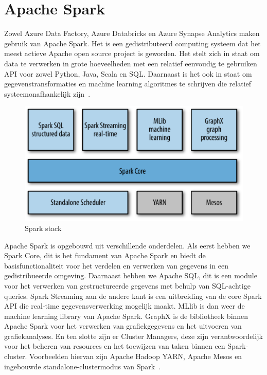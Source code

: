 \section{Apache Spark}
\label{sec:apachespark}

Zowel Azure Data Factory, Azure Databricks en Azure Synapse Analytics maken gebruik van Apache Spark. Het is een gedistributeerd computing systeem dat het meest actieve Apache open source project is geworden. Het stelt zich in staat om data te verwerken in grote hoeveelheden met een relatief eenvoudig te gebruiken API voor zowel Python, Java, Scala en SQL. Daarnaast is het ook in staat om gegevenstransformaties en machine learning algoritmes te schrijven die relatief systeemonafhankelijk zijn~\autocite{Karau2017}.

\begin{figure}[H]
    \centering
    \includegraphics[width=1\textwidth]{./graphics/spark/spark-stack.png}
    \caption{Spark stack~\autocite{Karau2015}}
\end{figure}

Apache Spark is opgebouwd uit verschillende onderdelen. Als eerst hebben we Spark Core, dit is het fundament van Apache Spark en biedt de basisfunctionaliteit voor het verdelen en verwerken van gegevens in een gedistribueerde omgeving. Daarnaast hebben we Apache SQL, dit is een module voor het verwerken van gestructureerde gegevens met behulp van SQL-achtige queries. Spark Streaming aan de andere kant is een uitbreiding van de core Spark API die real-time gegevensverwerking mogelijk maakt. MLlib is dan weer de machine learning library van Apache Spark. GraphX is de bibliotheek binnen Apache Spark voor het verwerken van grafiekgegevens en het uitvoeren van grafiekanalyses. En ten slotte zijn er Cluster Managers, deze zijn verantwoordelijk voor het beheren van resources en het toewijzen van taken binnen een Spark-cluster. Voorbeelden hiervan zijn Apache Hadoop YARN, Apache Mesos en ingebouwde standalone-clustermodus van Spark~\autocite{Karau2015}.

